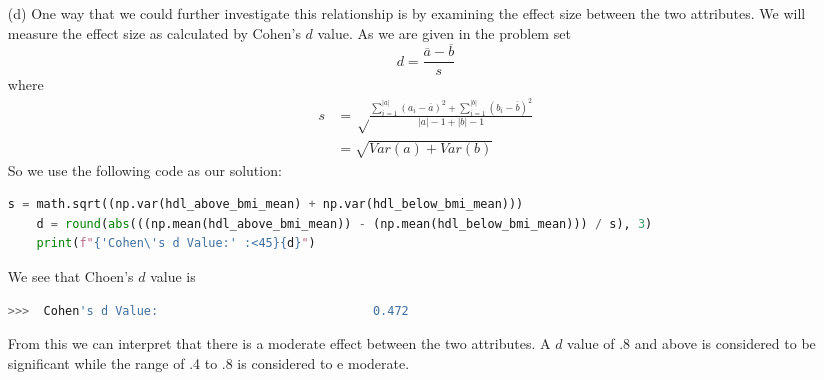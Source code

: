 \documentclass[12pt, letterpaper]{article}
\begin{document}
\begin{enumerate}
\newpage 
    \item [(d)] One way that we could further investigate this relationship is by examining the effect
    size between the two attributes. We will measure the effect size as calculated by Cohen's $d$ value. 
    As we are given in the problem set 
    \[
        d = \frac{\overline{a} - \overline{b}}{s}  
    \]
    where 
    \begin{align*}
        s &= \sqrt\frac{\sum_{i = 1}^{|a|}(a_i - \overline{a})^2 + \sum_{i = 1}^{|b|}(b_i - \overline{b})^2}{|a| - 1 + |b| - 1} \\
          &= \sqrt{Var(a) + Var(b)}
    \end{align*} 
    So we use the following code as our solution:
\begin{lstlisting}[language=python]
    s = math.sqrt((np.var(hdl_above_bmi_mean) + np.var(hdl_below_bmi_mean)))
    d = round(abs(((np.mean(hdl_above_bmi_mean)) - (np.mean(hdl_below_bmi_mean))) / s), 3)
    print(f"{'Cohen\'s d Value:' :<45}{d}")
\end{lstlisting}
    We see that Choen's $d$ value is 
\begin{lstlisting}[language=python]
    >>>  Cohen's d Value:                              0.472
\end{lstlisting}
    From this we can interpret that there is a moderate effect between the two attributes. A $d$ value of .8 
    and above is considered to be significant while the range of .4 to .8 is considered to e moderate.
\end{enumerate}

\newpage
\noindent\makebox[\linewidth]{\rule{18cm}{0.4pt}}
\end{document}
